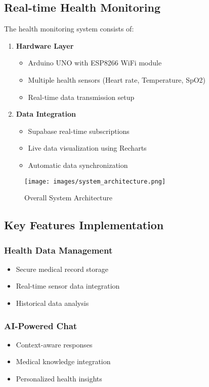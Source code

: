 \subsection{Real-time Health Monitoring}
The health monitoring system consists of:

\begin{enumerate}
    \item \textbf{Hardware Layer}
    \begin{itemize}
        \item Arduino UNO with ESP8266 WiFi module
        \item Multiple health sensors (Heart rate, Temperature, SpO2)
        \item Real-time data transmission setup
    \end{itemize}

    \item \textbf{Data Integration}
    \begin{itemize}
        \item Supabase real-time subscriptions
        \item Live data visualization using Recharts
        \item Automatic data synchronization
    \end{itemize}
\end{enumerate}

\begin{figure}[H]
    \centering
    \texttt{[image: images/system\_architecture.png]}
    \caption{Overall System Architecture}
\end{figure}

\subsection{Key Features Implementation}

\subsubsection{Health Data Management}
\begin{itemize}
    \item Secure medical record storage
    \item Real-time sensor data integration
    \item Historical data analysis
\end{itemize}

\subsubsection{AI-Powered Chat}
\begin{itemize}
    \item Context-aware responses
    \item Medical knowledge integration
    \item Personalized health insights
\end{itemize}

